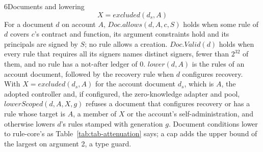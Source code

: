 \begin{perchdefinition}{6}{Documents and lowering}\label{def:documents-and-lowering}
\[X = \mathit{excluded}(d_s, A)\]
For a document \(d\) on account \(A\), \(\mathit{Doc.allows}(d, A, c, S)\) holds when some rule of \(d\) covers \(c\)'s contract and function, its argument constraints hold and its principals are signed by \(S\); no rule allows a creation. \(\mathit{Doc.Valid}(d)\) holds when every rule that requires all its signers names distinct signers, fewer than \(2^{32}\) of them, and no rule has a not-after ledger of 0. \(\mathit{lower}(d, A)\) is the rules of an account document, followed by the recovery rule when \(d\) configures recovery. With \(X = \mathit{excluded}(d_s, A)\) for the account document \(d_s\), which is \(A\), the adopted controller and, if configured, the zero-knowledge adapter and pool, \(\mathit{lowerScoped}(d, A, X, g)\) refuses a document that configures recovery or has a rule whose target is \(A\), a member of \(X\) or the account's self-administration, and otherwise lowers \(d\)'s rules stamped with generation \(g\). Document conditions lower to rule-core's  as Table~\ref{tab:tab-attenuation} says; a cap adds the upper bound of the largest  on argument 2, a type guard.
\end{perchdefinition}
